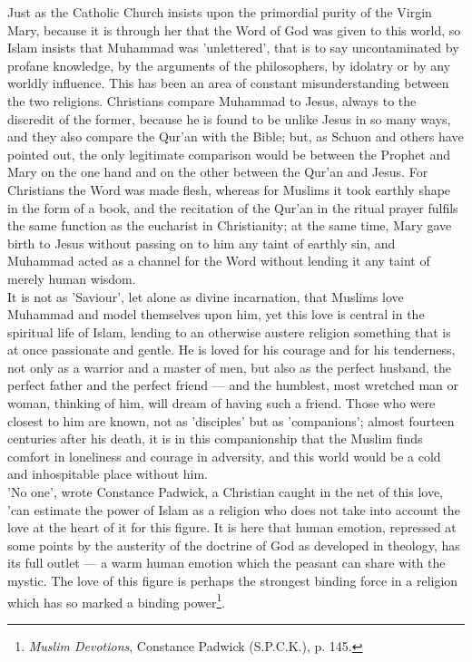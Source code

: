 \documentclass[11pt, b5paper, twoside]{book}
\begin{document}
Just as the Catholic Church insists upon the primordial purity of the Virgin Mary, because it is 
through her that the Word of God was given to this world, so Islam insists that Muhammad was 
'unlettered', that is to say uncontaminated by profane knowledge, by the arguments of the 
philosophers, by idolatry or by any worldly influence. This has been an area of constant 
misunderstanding between the two religions. Christians compare Muhammad to Jesus, always to the 
discredit of the former, because he is found to be unlike Jesus in so many ways, and they also 
compare the Qur'an with the Bible; but, as Schuon and others have pointed out, the only legitimate 
comparison would be between the Prophet and Mary on the one hand and on the other between the Qur'an and Jesus. For Christians the Word was made flesh, whereas for Muslims it took earthly shape in the form of a book, and the recitation of the Qur'an in the ritual prayer fulfils the same function as 
the eucharist in Christianity; at the same time, Mary gave birth to Jesus without passing on to him 
any taint of earthly sin, and Muhammad acted as a channel for the Word without lending it any taint 
of merely human wisdom. \\

It is not as 'Saviour', let alone as divine incarnation, that Muslims love Muhammad and model 
themselves upon him, yet this love is central in the spiritual life of Islam, lending to an otherwise 
austere religion something that is at once passionate and gentle. He is loved for his courage and for 
his tenderness, not only as a warrior and a master of men, but also as the perfect husband, the 
perfect father and the perfect friend --- and the humblest, most wretched man or woman, thinking of 
him, will dream of having such a friend. Those who were closest to him are known, not as 'disciples' 
but as 'companions'; almost fourteen centuries after his death, it is in this companionship that the 
Muslim finds comfort in loneliness and courage in adversity, and this world would be a cold and 
inhospitable place without him. \\

'No one', wrote Constance Padwick, a Christian caught in the net of this love, 'can estimate the 
power of Islam as a religion who does not take into account the love at the heart of it for this 
figure. It is here that human emotion, repressed at some points by the austerity of the doctrine of 
God as developed in theology, has its full outlet --- a warm human emotion which the peasant can share 
with the mystic. The love of this figure is perhaps the strongest binding force in a religion which 
has so marked a binding power\footnote{\emph{Muslim Devotions}, Constance Padwick (S.P.C.K.), p. 145.}. \\
\end{document}
